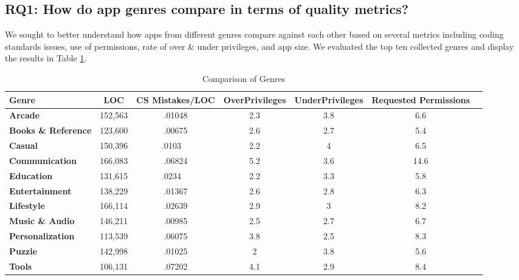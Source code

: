 \documentclass{sig-alternate}
\begin{document}
\subsection{RQ1: How do app genres compare in terms of quality metrics?}

We sought to better understand how apps from different genres compare against each other based on several metrics including coding standards issues, use of permissions, rate of over \& under privileges, and app size. We evaluated the top ten collected genres and display the results in Table \ref{Table:topGenres}.


\begin{table}
\begin{center}
\caption{Comparison of Genres}
\label{Table:topGenres}
 \begin{tabular}{ | l | c | c | c | c | c |  c |} \hline

  \bfseries Genre & \bfseries LOC & \bfseries CS Mistakes/LOC & \bfseries OverPrivileges & \bfseries UnderPrivileges & \bfseries Requested Permissions    \\ \hline

 	\bfseries Arcade &	152,563	 &	.01048 &	2.3 &	3.8 &	6.6 \\ \hline
 	\bfseries Books \& Reference &	123,600	 &	.00675 &	2.6 &	2.7 &	5.4 \\ \hline
	\bfseries Casual &	150,396 &		.0103~~ &	2.2 &	4 &	6.5 \\ \hline
 	\bfseries Communication & 	166,083  &	.06824 &	5.2 &	3.6 &	14.6 \\ \hline
	\bfseries Education &	131,615 &	.0234~~ &	2.2 &	3.3 &	5.8 \\ \hline
 	\bfseries Entertainment &	138,229 &	.01367 &	2.6 &	2.8 &	6.3 \\ \hline
 	\bfseries Lifestyle &	166,114 & 	.02639 &	2.9 &	3 &	8.2 \\ \hline
 	\bfseries Music \& Audio &	146,211	 &	.00985 &	2.5 &	2.7 &	6.7 \\ \hline
  	\bfseries Personalization &	113,539	  & 	.06075 &	3.8 &	2.5 &	8.3 \\ \hline
 	\bfseries Puzzle &	142,998 & 	.01025 &	2 &	3.8 & 	5.6 \\ \hline
	\bfseries Tools	 & 106,131 &	.07202 &	4.1 &	2.9 &	8.4 \\ \hline
	

\end{tabular}
\end{center}
\end{table}
\end{document}
